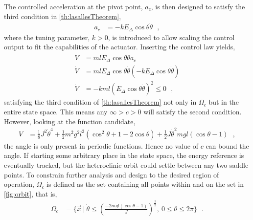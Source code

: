 %
The controlled acceleration at the pivot point, $a_c$, is then designed to satisfy the third condition in \autoref{th:lasallesTheorem},
\begin{align}
  a_c &= -k E_\Delta \cos \theta \dot{\theta}  \ \ \ ,  \label{eq:accControlLaw}
\end{align}
where the tuning parameter, $k>0$, is introduced to allow scaling the control output to fit the capabilities of the actuator. Inserting the control law yields,
\begin{align}
  \dot{V} &= m l E_\Delta \cos \theta \dot{\theta} a_c  \\
  \dot{V} &= m l E_\Delta \cos \theta \dot{\theta} (-k E_\Delta \cos \theta \dot{\theta})     \label{eq:lyapunovDerivativeControlled1} \\
  \dot{V} &= -k m l (E_\Delta \cos \theta \dot{\theta})^2  \leq 0  \ \ \ ,   \label{eq:lyapunovDerivativeControlled2} 
\end{align}
satisfying the third condition of \autoref{th:lasallesTheorem} not only in $\Omega_c$ but in the entire state space. This means any $\infty>c>0$ will satisfy the second condition. However, looking at the function candidate,
\begin{align}
V &= \tfrac{1}{8} J^2 \dot{\theta}^4 + \tfrac{1}{2} m^2 g^2 l^2 ( \cos^2 \theta + 1 -2\cos \theta )  +  \tfrac{1}{2} J \dot{\theta}^2  m g l (\cos \theta -1)  \ \ \ , \label{eq:functionCandidate3}
\end{align}
the angle is only present in periodic functions. Hence no value of $c$ can bound the angle. If starting some arbitrary place in the state space, the energy reference is eventually tracked, but the heteroclinic orbit could settle between any two saddle points. To constrain further analysis and design to the desired region of operation, $\Omega_c$ is defined as the set containing all points within and on the set in \autoref{fig:orbit}, that is,
\begin{align}
  \Omega_c &=  \{ \vec{x} \ | \ \dot{\theta} \leq \left(\frac{-2 m g l (\cos \theta -1)}{J}\right)^{\tfrac{1}{2}} , \ 0 \leq \theta \leq 2 \pi  \} \ \ \ . \label{eq:omegaC}
\end{align}
%
